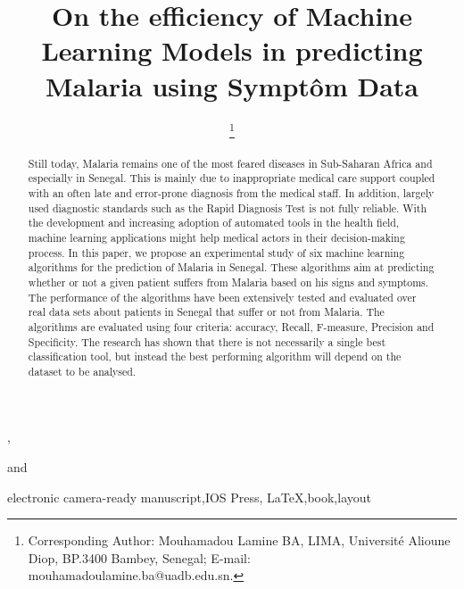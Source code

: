 \documentclass{IOS-Book-Article}
\def\hb{\hbox to 10.7 cm{}}
\begin{document}
\pagestyle{headings}
\def\thepage{}

\begin{frontmatter}              %

\title{On the efficiency of Machine Learning Models in predicting Malaria using Sympt\^om Data}

\markboth{}{January 2020\hb}

\author{ },
\author{ 
\thanks{Corresponding Author: Mouhamadou Lamine BA, LIMA, Universit\'e Alioune Diop,
BP.3400 Bambey, Senegal; E-mail: mouhamadoulamine.ba@uadb.edu.sn.}}
and
\author{ }

\address{LIMA, Universit\'e Alioune Diop, Bambey, Senegal}

\begin{abstract}
Still today, Malaria remains one of the most feared diseases in Sub-Saharan Africa and especially in Senegal. This is mainly due to inappropriate medical care support coupled with an often late and error-prone diagnosis from the medical staff. In addition, largely used diagnostic standards such as the Rapid Diagnosis Test is not fully reliable. With the development and increasing adoption of automated tools in the health field, machine learning applications might help medical actors in their decision-making process. In this paper, we propose an experimental study of six machine learning algorithms for the prediction of Malaria in Senegal. These algorithms aim at predicting whether or not a given patient suffers from Malaria based on his signs and symptoms. The performance of the algorithms have been extensively tested and evaluated over real data sets about patients in Senegal that suffer or not from Malaria. The algorithms are evaluated using four criteria: accuracy, Recall, F-measure, Precision and Specificity. The research has shown that there is not necessarily a single best classification tool, but instead the best performing algorithm will depend on the dataset to be analysed.
\end{abstract}

\begin{keyword}
electronic camera-ready manuscript\sep IOS Press\sep
\LaTeX\sep book\sep layout
\end{keyword}
\end{frontmatter}
\markboth{January 2020\hb}{January 2020\hb}



















\end{document}
